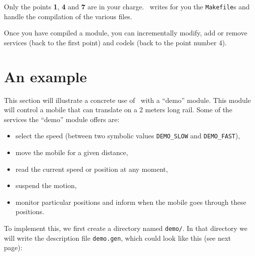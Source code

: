 Only the points \textbf{1}, \textbf{4} and \textbf{7} are in your charge. \GenoM\
writes for you   the \texttt{Makefile}s  and  handle the compilation of  the
various files.

Once you have  compiled a module,  you  can incrementally modify, add  or
remove services (back to  the first point) and  codels (back to the point
number 4).

\section{An example}
\label{sec|session|example}

This section will  illustrate a concrete use  of \GenoM\ with  a ``demo''
module. This module  will  control a  mobile that  can translate  on  a 2
meters long rail. Some of the services the ``demo'' module offers are:

\begin{itemize}
   \item select the speed (between two symbolic values \texttt{DEMO\_SLOW}
and \texttt{DEMO\_FAST}),
   \item move the mobile for a given distance,
   \item read the current speed or position at any moment,
   \item suspend the motion,
   \item monitor particular positions and inform when the mobile goes
through these positions.
\end{itemize}

To implement this, we first create a directory named \texttt{demo/}. In that
directory we will write the description file \texttt{demo.gen}, which could
look like this (see next page):
\vfill\eject

